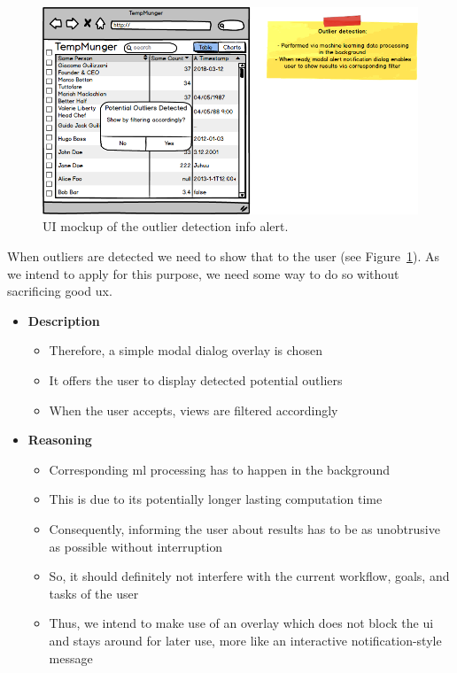 \begin{figure}[h]
  \centering
  \includegraphics[width=1.1\textwidth]{figures/design/mockup-4}
  \caption{UI mockup of the outlier detection info alert.}
  \label{fig:mockup-4}
\end{figure}

When outliers are detected we need to show that to the user (see Figure~\ref{fig:mockup-4}).
As we intend to apply  for this purpose, we need some way to do so without sacrificing good \gls{ux}.

\begin{itemize}
  \item \textbf{Description}
  \begin{itemize}
    \item Therefore, a simple modal dialog overlay is chosen
    \item It offers the user to display detected potential outliers
    \item When the user accepts, views are filtered accordingly
  \end{itemize}
  \item \textbf{Reasoning}
  \begin{itemize}
    \item Corresponding \gls{ml} processing has to happen in the background
    \item This is due to its potentially longer lasting computation time
    \item Consequently, informing the user about results has to be as unobtrusive as possible without interruption
    \item So, it should definitely not interfere with the current workflow, goals, and tasks of the user
    \item Thus, we intend to make use of an overlay which does not block the \gls{ui} and stays around for later use, more like an interactive notification-style message
  \end{itemize}
\end{itemize}


